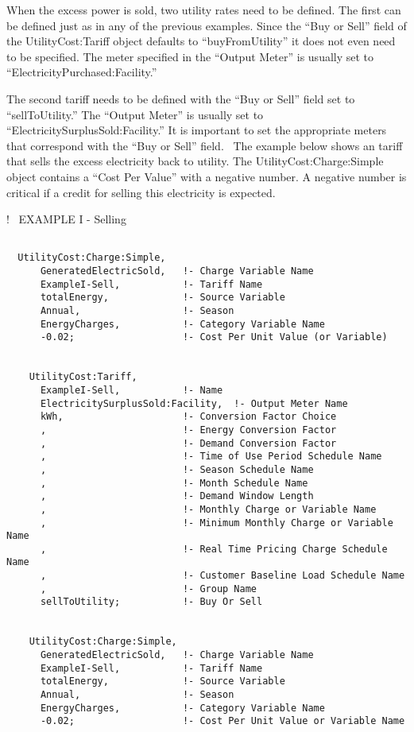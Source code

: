 When the excess power is sold, two utility rates need to be defined. The first can be defined just as in any of the previous examples. Since the ``Buy or Sell'' field of the UtilityCost:Tariff object defaults to ``buyFromUtility'' it does not even need to be specified. The meter specified in the ``Output Meter'' is usually set to ``ElectricityPurchased:Facility.''

The second tariff needs to be defined with the ``Buy or Sell'' field set to ``sellToUtility.'' The ``Output Meter'' is usually set to ``ElectricitySurplusSold:Facility.'' It is important to set the appropriate meters that correspond with the ``Buy or Sell'' field.~ The example below shows an tariff that sells the excess electricity back to utility. The UtilityCost:Charge:Simple object contains a ``Cost Per Value'' with a negative number. A negative number is critical if a credit for selling this electricity is expected.

!~ EXAMPLE I - Selling

\begin{lstlisting}

  UtilityCost:Charge:Simple,
      GeneratedElectricSold,   !- Charge Variable Name
      ExampleI-Sell,           !- Tariff Name
      totalEnergy,             !- Source Variable
      Annual,                  !- Season
      EnergyCharges,           !- Category Variable Name
      -0.02;                   !- Cost Per Unit Value (or Variable)


    UtilityCost:Tariff,
      ExampleI-Sell,           !- Name
      ElectricitySurplusSold:Facility,  !- Output Meter Name
      kWh,                     !- Conversion Factor Choice
      ,                        !- Energy Conversion Factor
      ,                        !- Demand Conversion Factor
      ,                        !- Time of Use Period Schedule Name
      ,                        !- Season Schedule Name
      ,                        !- Month Schedule Name
      ,                        !- Demand Window Length
      ,                        !- Monthly Charge or Variable Name
      ,                        !- Minimum Monthly Charge or Variable Name
      ,                        !- Real Time Pricing Charge Schedule Name
      ,                        !- Customer Baseline Load Schedule Name
      ,                        !- Group Name
      sellToUtility;           !- Buy Or Sell


    UtilityCost:Charge:Simple,
      GeneratedElectricSold,   !- Charge Variable Name
      ExampleI-Sell,           !- Tariff Name
      totalEnergy,             !- Source Variable
      Annual,                  !- Season
      EnergyCharges,           !- Category Variable Name
      -0.02;                   !- Cost Per Unit Value or Variable Name
\end{lstlisting}

